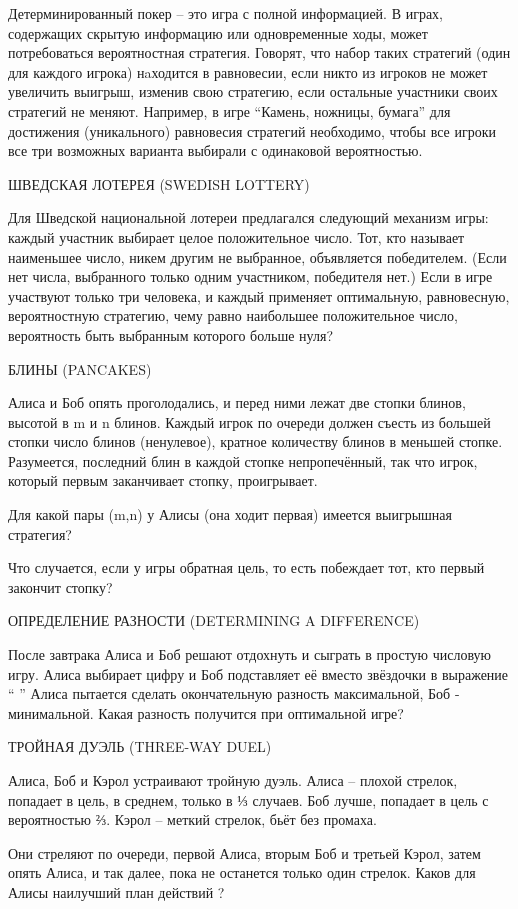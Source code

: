    Детерминированный покер -- это игра с полной информацией. В играх, содержащих скрытую информацию или одновременные ходы, может потребоваться вероятностная стратегия. Говорят, что набор таких стратегий (один для каждого игрока) нaходится в равновесии, если никто из игроков не может увеличить выигрыш, изменив свою стратегию, если остальные участники своих стратегий не меняют. Например, в игре “Камень, ножницы, бумага”  для достижения (уникального) равновесия стратегий необходимо, чтобы все игроки все три возможных варианта выбирали с одинаковой вероятностью.


 ШВЕДСКАЯ ЛОТЕРЕЯ (SWEDISH LOTTERY)




Для Шведской национальной лотереи предлагался следующий механизм игры: каждый участник выбирает  целое положительное число. Тот, кто называет наименьшее число, никем другим не выбранное, объявляется победителем. (Если нет числа, выбранного только одним участником, победителя нет.)
   Если в игре участвуют только три человека, и каждый применяет оптимальную, равновесную, вероятностную стратегию, чему равно наибольшее положительное число,  вероятность быть выбранным которого больше нуля?


БЛИНЫ (PANCAKES)


Алиса и Боб опять проголодались, и перед ними лежат две стопки блинов, высотой в m и n блинов. Каждый игрок по очереди должен съесть из большей стопки число блинов (ненулевое), кратное количеству блинов в меньшей стопке. Разумеется, последний блин в каждой стопке непропечённый, так что игрок, который первым заканчивает стопку, проигрывает.


   Для какой пары (m,n) у Алисы (она ходит первая) имеется выигрышная стратегия?


  Что случается, если у игры обратная цель, то есть побеждает тот, кто первый закончит стопку?




  ОПРЕДЕЛЕНИЕ РАЗНОСТИ (DETERMINING A DIFFERENCE)


После завтрака Алиса и Боб решают отдохнуть и сыграть в простую числовую игру. Алиса выбирает цифру и Боб подставляет её вместо звёздочки в выражение “ ” Алиса пытается сделать окончательную разность максимальной, Боб - минимальной.  Какая разность получится при оптимальной игре?




ТРОЙНАЯ ДУЭЛЬ (THREE-WAY DUEL)


Алиса, Боб и Кэрол устраивают тройную дуэль. Алиса -- плохой стрелок, попадает в цель, в среднем, только в  ⅓  случаев. Боб лучше, попадает в цель с вероятностью ⅔. Кэрол -- меткий стрелок, бьёт без промаха.
    
   Они стреляют по очереди, первой Алиса, вторым Боб и третьей  Кэрол, затем опять Алиса, и так далее, пока не останется только один стрелок. Каков для Алисы наилучший план действий ?
